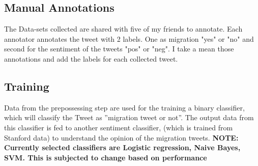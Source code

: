 \subsection{Manual Annotations}
The Data-sets collected are shared with five of my friends to annotate. Each annotator annotates the tweet with 2 labels. One as migration "yes" or "no" and second for the sentiment of the tweets "pos" or "neg". I take a mean those annotations and add the labels for each collected tweet. 

\subsection{Training}
Data from the prepossessing step are used for the training a binary classifier,
which will classify the Tweet as ”migration tweet or not”. The output data
from this classifier is fed to another sentiment classifier, (which is trained from
Stanford data) to understand the opinion of the migration tweets.
\textbf{NOTE: Currently selected classifiers are Logistic regression, Naive Bayes, SVM. This is subjected to change based on performance}